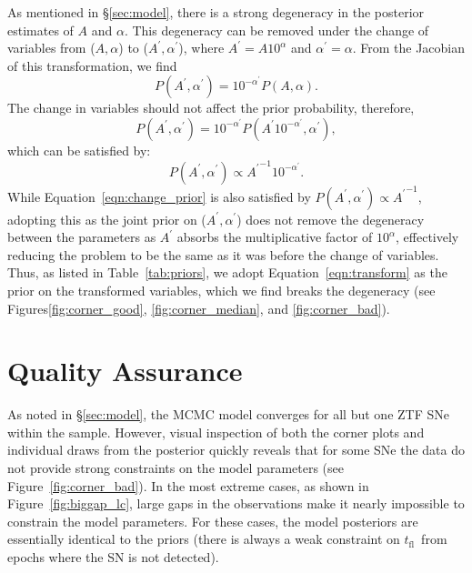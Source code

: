 \documentclass[twocolumn]{aastex63}
\newcommand{\tfl}{$t_\mathrm{fl}$}
\begin{document}
As mentioned in \S\ref{sec:model}, there is a strong degeneracy in the
posterior estimates of $A$ and $\alpha$. This degeneracy can be removed under
the change of variables from ($A, \alpha$) to ($A^\prime, \alpha^\prime$),
where $A^\prime = A 10^\alpha$ and $\alpha^\prime = \alpha$. From the Jacobian
of this transformation, we find
$$P(A^\prime, \alpha^\prime) = 10^{-\alpha^\prime} P(A,\alpha).$$
The change in variables should not affect the prior probability, therefore,
\begin{equation} 
    P(A^\prime, \alpha^\prime) = 10^{-\alpha^\prime} P(A^\prime
10^{-\alpha^\prime},\alpha^\prime), 
\label{eqn:change_prior} 
\end{equation}
which can be satisfied by:
\begin{equation}
    P(A^\prime, \alpha^\prime) \propto {A^\prime}^{-1} 10^{-\alpha^\prime}.
\label{eqn:transform}
\end{equation}
While Equation~\ref{eqn:change_prior} is also satisfied by $P(A^\prime,
\alpha^\prime) \propto {A^\prime}^{-1}$, adopting this as the joint prior on
($A^\prime, \alpha^\prime$) does not remove the degeneracy between the
parameters as $A^\prime$ absorbs the multiplicative factor of $10^\alpha$,
effectively reducing the problem to be the same as it was before the change of
variables. Thus, as listed in Table~\ref{tab:priors}, we adopt
Equation~\ref{eqn:transform} as the prior on the transformed variables, which
we find breaks the degeneracy (see Figures\ref{fig:corner_good},
\ref{fig:corner_median}, and \ref{fig:corner_bad}).

\section{Quality Assurance}\label{sec:qa}

As noted in \S\ref{sec:model}, the MCMC model converges for all but one ZTF
SNe within the sample. However, visual inspection of both the corner plots and
individual draws from the posterior quickly reveals that for some SNe the data
do not provide strong constraints on the model parameters (see Figure~\ref{fig:corner_bad}). In the most extreme cases, as shown in
Figure~\ref{fig:biggap_lc}, large gaps in the observations make it nearly
impossible to constrain the model parameters. For these cases, the model
posteriors are essentially identical to the priors (there is always a weak
constraint on \tfl\ from epochs where the SN is not detected).
\end{document}
